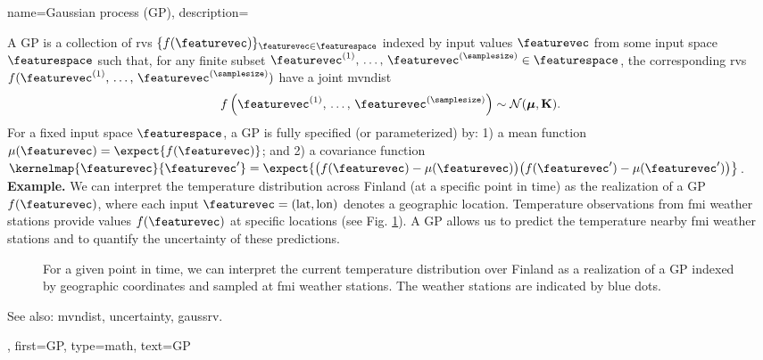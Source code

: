 {name={Gaussian process (GP)},
  description={A GP is a collection of \glspl{rv} 
  	$\{f(\featurevec)\}_{\featurevec \in \featurespace}$ indexed by input values $\featurevec$ 
  	from some input space $\featurespace$ such that, for any finite subset 
  	$\featurevec^{(1)}, \,\ldots, \,\featurevec^{(\samplesize)} \in \featurespace$, 
  	the corresponding \glspl{rv} $f(\featurevec^{(1)}, \,\ldots, \,\featurevec^{(\samplesize)})$ 
	have a joint \gls{mvndist} 
  	\[
  	f \left( \featurevec^{(1)}, \,\ldots, \,\featurevec^{(\samplesize)} \right) \sim \mathcal{N}(\boldsymbol{\mu}, \mathbf{K}).
  	\]
  	For a fixed input space $\featurespace$, a GP is 
	fully specified (or parameterized) by: 1) a \gls{mean} \gls{function} 
	$\mu(\featurevec) = \expect\{ f(\featurevec)\}$; and 2) 
	a \gls{covariance} \gls{function} $\kernelmap{\featurevec}{\featurevec'}= \expect\{ \big(f(\featurevec)-\mu(\featurevec)\big) \big(f(\featurevec')-\mu(\featurevec')\big) \big\}$.\\
  	{\bf Example.} We can interpret the temperature distribution across Finland (at a specific 
  	point in time) as the \gls{realization} of a GP $f(\featurevec)$, where each input 
	$\featurevec = (\text{lat}, \text{lon})$ denotes a geographic location. Temperature 
	observations from \gls{fmi} weather stations provide values $f(\featurevec)$ at specific 
	locations (see Fig. \ref{fig_gp_FMI_dict}). A GP allows us to predict the temperature 
	nearby \gls{fmi} weather stations and to quantify the \gls{uncertainty} 
  	of these \glspl{prediction}. 
  	\begin{figure}[H]
  	\begin{center}
		\vspace*{-15mm}
	\end{center}
	\caption{For a given point in time, we can interpret the current temperature distribution 
	over Finland as a \gls{realization} of a GP indexed by geographic coordinates and 
	sampled at \gls{fmi} weather stations. The weather stations are indicated by blue dots. \label{fig_gp_FMI_dict}}
	\end{figure}
	See also: \gls{mvndist}, \gls{uncertainty}, \gls{gaussrv}.}, 
  first={GP}, 
  type=math, 
  text={GP}
}

